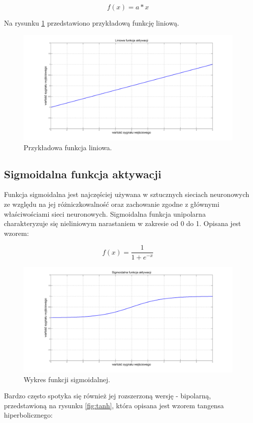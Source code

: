 $$ 
f(x) = a*x
$$

Na rysunku \ref{fig:lin} przedstawiono przykładową funkcję liniową.
\begin{figure}[!htbp]
\centering
\includegraphics[width=1\linewidth]{./include/lin}
\caption{Przykładowa funkcja liniowa.}
\label{fig:lin}
\end{figure}

\subsection{Sigmoidalna funkcja aktywacji}
Funkcja sigmoidalna jest najczęściej używana w sztucznych sieciach neuronowych ze względu na jej różniczkowalność oraz zachowanie zgodne z głównymi właściwościami sieci neuronowych. Sigmoidalna funkcja unipolarna charakteryzuje się nieliniowym narastaniem w zakresie od 0 do 1. Opisana jest wzorem:

$$ 
f(x) = \frac{1}{1 + e^{-x}}
$$

\begin{figure}[!htbp]
\centering
\includegraphics[width=1\linewidth]{./include/sig}
\caption{Wykres funkcji sigmoidalnej.}
\label{fig:sig}
\end{figure}

Bardzo często spotyka się również jej rozszerzoną wersję - bipolarną, przedstawioną na rysunku \ref{fig:tanh}, która opisana jest wzorem tangensa hiperbolicznego:

